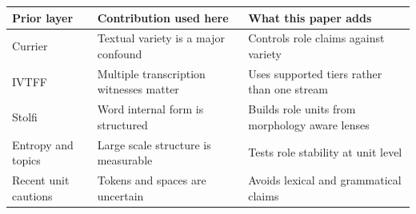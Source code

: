 {\scriptsize
\begin{tabular}{lll}
\toprule
Prior layer & Contribution used here & What this paper adds \\
\midrule
Currier & Textual variety is a major confound & Controls role claims against variety \\
IVTFF & Multiple transcription witnesses matter & Uses supported tiers rather than one stream \\
Stolfi & Word internal form is structured & Builds role units from morphology aware lenses \\
Entropy and topics & Large scale structure is measurable & Tests role stability at unit level \\
Recent unit cautions & Tokens and spaces are uncertain & Avoids lexical and grammatical claims \\
\bottomrule
\end{tabular}
}
